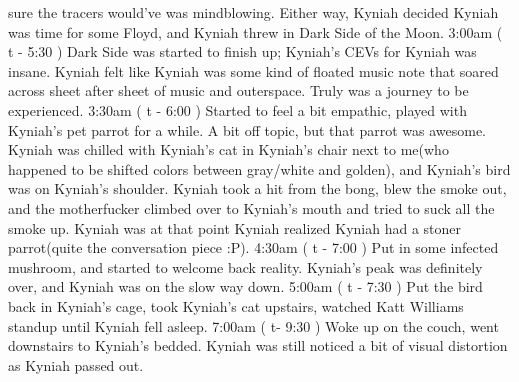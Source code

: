 \documentclass[12pt]{book}
\begin{document}
sure the tracers would've was mindblowing. Either way, Kyniah decided Kyniah was time for some Floyd, and Kyniah threw in Dark Side of the Moon. 3:00am ( t - 5:30 ) Dark Side was started to finish up; Kyniah's CEVs for Kyniah was insane. Kyniah felt like Kyniah was some kind of floated music note that soared across sheet after sheet of music and outerspace. Truly was a journey to be experienced. 3:30am ( t - 6:00 ) Started to feel a bit empathic, played with Kyniah's pet parrot for a while. A bit off topic, but that parrot was awesome. Kyniah was chilled with Kyniah's cat in Kyniah's chair next to me(who happened to be shifted colors between gray/white and golden), and Kyniah's bird was on Kyniah's shoulder. Kyniah took a hit from the bong, blew the smoke out, and the motherfucker climbed over to Kyniah's mouth and tried to suck all the smoke up. Kyniah was at that point Kyniah realized Kyniah had a stoner parrot(quite the conversation piece :P). 4:30am ( t - 7:00 ) Put in some infected mushroom, and started to welcome back reality. Kyniah's peak was definitely over, and Kyniah was on the slow way down. 5:00am ( t - 7:30 ) Put the bird back in Kyniah's cage, took Kyniah's cat upstairs, watched Katt Williams standup until Kyniah fell asleep. 7:00am ( t- 9:30 ) Woke up on the couch, went downstairs to Kyniah's bedded. Kyniah was still noticed a bit of visual distortion as Kyniah passed out.
\end{document}
